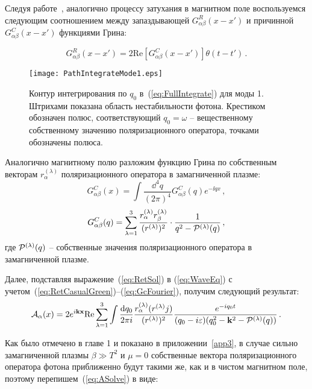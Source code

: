 Следуя работе~\cite{MikhChist:2001}, аналогично процессу затухания в магнитном поле воспользуемся следующим соотношением между запаздывающей $G^R_{\alpha\beta}(x-x')$ и причинной $G^C_{\alpha\beta}(x-x')$ функциями Грина:

\begin{equation}\label{eq:RetCasualGreen}
G^R_{\alpha\beta}(x-x')= 2 \mathrm{Re} \left[G^C_{\alpha\beta}(x-x')\right]\theta(t-t')\, .
\end{equation}

\begin{center}
	\begin{figure}[t!]\centering
		\texttt{[image: PathIntegrateMode1.eps]}
		\caption{Контур интегрирования по $q_0$ в~(\ref{eq:FullIntegrate}) для моды 1. Штрихами показана область нестабильности фотона. Крестиком обозначен полюс, соответствующий $q_0=\omega$ -- вещественному собственному значению поляризационного оператора, точками обозначены полюса.} \label{fig:FullPathIntegrMode1}
	\end{figure}
\end{center}

Аналогично магнитному полю разложим функцию Грина по собственным векторам $r_\alpha^{(\lambda)}$ поляризационного оператора в замагниченной плазме:
\begin{equation}\label{eq:InvGcFourier}
	G^C_{\alpha\beta}(x)=\int \frac{\dd^4q}{(2\pi)^4}G^C_{\alpha \beta}(q) e^{-\ii qx}\, ,
\end{equation}
\begin{equation}\label{eq:GcFourier}
	G^C_{\alpha\beta}(q)=\sum_{\lambda=1}^{3}\frac{r_\alpha^{(\lambda)}r^{(\lambda)}_\beta}{(r^{(\lambda)})^2}\cdot \frac{1}{q^2-{\cal P}^{(\lambda)}(q)}\, ,
\end{equation}
где ${\cal P}^{(\lambda)}(q)$ -- собственные значения поляризационного оператора в замагниченной плазме.

Далее, подставляя выражение~(\ref{eq:RetSol}) в (\ref{eq:WaveEq}) с учетом~(\ref{eq:RetCasualGreen})--(\ref{eq:GcFourier}), получим следующий результат:
\begin{equation}\label{eq:ASolvePlasma}
	{\cal A}_\alpha(x) = 2 e^{i \mathbf{kx}} \mathrm{Re} \sum_{\lambda=1}^3 \int\frac{\mathrm{d} q_0}{2\pi i}\frac{r_\alpha^{(\lambda)}(r^{(\lambda)} j)}{(r^{(\lambda)})^2}\frac{e^{-i q_0 t}}{(q_0-i\varepsilon)(q_0^2-\mathbf{k}^2-{\cal P}^{(\lambda)}(q))}\, .
\end{equation}

Как было отмечено в главе 1 и показано в приложении~\ref{app3}, в случае сильно замагниченной плазмы $\beta\gg T^2$ и $\mu=0$ собственные вектора поляризационного оператора фотона приближенно будут такими же, как и в чистом магнитном поле, поэтому перепишем~(\ref{eq:ASolve}) в виде:

